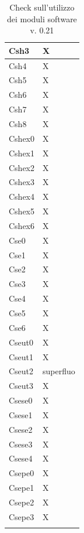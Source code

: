 \begin{footnotesize}
\begin{longtable}{|p{}|p{}|}
 Csh3 &X  \\ \hline
 Csh4 &X  \\ \hline
 Csh5 &X  \\ \hline
 Csh6 &X  \\ \hline
 Csh7 &X  \\ \hline
 Csh8 &X  \\ \hline
 Cshex0 &X  \\ \hline
 Cshex1 &X  \\ \hline
 Cshex2 &X  \\ \hline
 Cshex3 &X  \\ \hline
 Cshex4 &X  \\ \hline
 Cshex5 &X  \\ \hline
 Cshex6 &X  \\ \hline
 Cse0 &X  \\ \hline
 Cse1 &X  \\ \hline
 Cse2 &X  \\ \hline
 Cse3 &X  \\ \hline
 Cse4 &X  \\ \hline
 Cse5 &X  \\ \hline
 Cse6 &X  \\ \hline
 Cseut0 &X  \\ \hline
 Cseut1 &X  \\ \hline
 Cseut2 &superfluo  \\ \hline
 Cseut3 &X  \\ \hline
 Csese0 &X  \\ \hline
 Csese1 &X  \\ \hline
 Csese2 &X  \\ \hline
 Csese3 &X  \\ \hline
 Csese4 &X  \\ \hline
 Csepe0 &X  \\ \hline
 Csepe1 &X  \\ \hline
 Csepe2 &X  \\ \hline
 Csepe3 &X  \\ \hline

\caption{Check sull'utilizzo dei moduli software v. 0.21}
\end{longtable}
\end{footnotesize}

